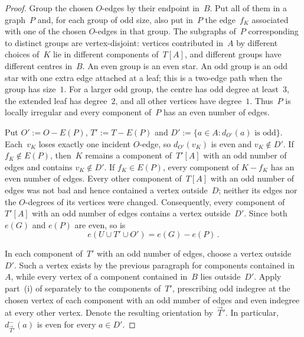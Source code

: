\documentclass[12pt,reqno,a4paper]{amsart}
\begin{document}
\begin{proof}
  Group the chosen $O$-edges by their endpoint in~$B$.
  Put all of them in a graph~$P$ and, for each group of odd size, also put
  in~$P$ the edge~$f_K$ associated with one of the chosen $O$-edges in that
  group.
  The subgraphs of~$P$ corresponding to distinct groups are vertex-disjoint:
  vertices contributed in~$A$ by different choices of~$K$ lie in different
  components of~$T[A]$, and different groups have different centres in~$B$.
  An even group is an even star.
  An odd group is an odd star with one extra edge attached at a leaf; this is a
  two-edge path when the group has size~$1$. 
  For a larger odd group, the centre has odd degree at least~$3$, the extended
  leaf has degree~$2$, and all other vertices have degree~$1$. 
  Thus~$P$ is locally irregular and every component of~$P$ has an even number
  of edges.

  Put $O' := O - E(P)$, $T' := T - E(P)$ and $D' := \{a \in A \colon d_{O'}(a)
  \text{ is odd}\}$.
  Each~$v_K$ loses exactly one incident $O$-edge, so $d_{O'}(v_K)$ is even and
  $v_K \notin D'$.
  If $f_K \notin E(P)$, then~$K$ remains a component of~$T'[A]$ with an odd
  number of edges and contains $v_K \notin D'$.
  If $f_K \in E(P)$, every component of $K-f_K$ has an even number of edges.
  Every other component of~$T[A]$ with an odd number of edges was not bad and
  hence contained a vertex outside~$D$; neither its edges nor the $O$-degrees
  of its vertices were changed. 
  Consequently, every component of~$T'[A]$ with an odd number of edges contains
  a vertex outside~$D'$. 
  Since both $e(G)$ and $e(P)$ are even, so is
  \[
    e(U \cup T' \cup O') = e(G) - e(P) \,.
  \]

  In each component of~$T'$ with an odd number of edges, choose a vertex
  outside~$D'$. 
  Such a vertex exists by the previous paragraph for components contained
  in~$A$, while every vertex of a component contained in~$B$ lies outside~$D'$.
  Apply part~(i) of  separately to the components
  of~$T'$, prescribing odd indegree at the chosen vertex of each component with
  an odd number of edges and even indegree at every other vertex. 
  Denote the resulting orientation by~$\vec T'$. 
  In particular, $d^-_{\vec T'}(a)$ is even for every $a \in D'$.


\end{proof}
\end{document}
